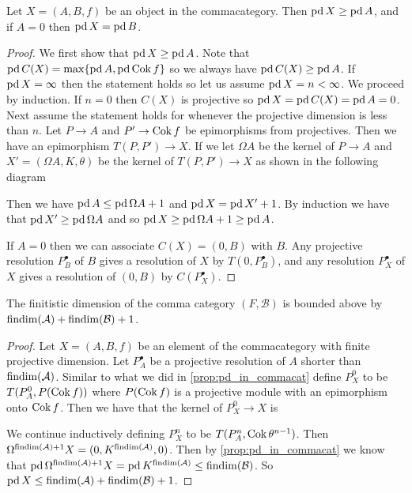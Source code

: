 \begin{prop}\cite[Lemma~4.16]{FGR75}\label{prop:pd_in_commacat}
	Let $X = (A, B, f)$ be an object in the commacategory. Then $\operatorname{pd} X \geq \operatorname{pd} A$, and if $A=0$ then $\operatorname{pd} X = \operatorname{pd} B$.
	\begin{proof}
		We first show that $\operatorname{pd} X \geq \operatorname{pd} A$. Note that $\operatorname{pd} C(X) = \max\{ \operatorname{pd} A, \operatorname{pd} \operatorname{Cok} f \}$ so we always have $\operatorname{pd} C(X) \geq \operatorname{pd} A$. If $\operatorname{pd} X = \infty$ then the statement holds so let us assume $\operatorname{pd} X = n < \infty$. We proceed by induction. If $n=0$ then $C(X)$ is projective so $\operatorname{pd} X = \operatorname{pd} C(X) = \operatorname{pd} A = 0$. Next assume the statement holds for whenever the projective dimension is less than $n$. Let $P \to A$ and $P' \to \operatorname{Cok} f$ be epimorphisms from projectives. Then we have an epimorphism $T(P, P') \to X$. If we let $\Omega A$ be the kernel of $P \to A$ and $X' = (\Omega A, K, \theta)$ be the kernel of $T(P, P') \to X$ as shown in the following diagram
		\begin{center}
		\end{center}
		Then we have $\operatorname{pd} A \leq \operatorname{pd} \Omega A + 1$ and $\operatorname{pd} X = \operatorname{pd} X' + 1$. By induction we have that $\operatorname{pd} X' \geq \operatorname{pd} \Omega A$ and so $\operatorname{pd} X \geq \operatorname{pd} \Omega A +1 \geq \operatorname{pd} A$. 
		
		If $A=0$ then we can associate $C(X)=(0, B)$ with $B$. Any projective resolution $P_B^\bullet$ of $B$ gives a resolution of $X$ by $T(0, P_B^\bullet)$, and any resolution $P_X^\bullet$ of $X$ gives a resolution of $(0, B)$ by $C(P_X^\bullet)$. 
	\end{proof}
\end{prop}

\begin{theorem}\cite[Theorem~4.20]{FGR75}
	The finitistic dimension of the comma category $(F, \mathcal B)$ is bounded above by $\operatorname{findim}(\mathcal A) + \operatorname{findim}(\mathcal B) + 1$.
	\begin{proof}
		Let $X=(A, B, f)$ be an element of the commacategory with finite projective dimension. Let $P_A^\bullet$ be a projective resolution of $A$ shorter than $\operatorname{findim}(\mathcal A)$. Similar to what we did in \cref{prop:pd_in_commacat} define $P_X^0$ to be $T(P_A^0, P(\operatorname{Cok} f))$ where $P(\operatorname{Cok} f)$ is a projective module with an epimorphism onto $\operatorname{Cok} f$. Then we have that the kernel of $P_X^0 \to X$ is 
		We continue inductively defining $P_X^n$ to be $T(P_A^n, \operatorname{Cok} \theta^{n-1})$. Then $\Omega^{\operatorname{findim}(\mathcal A)+1} X = (0, K^{\operatorname{findim}(\mathcal A)}, 0)$. Then by \cref{prop:pd_in_commacat} we know that $\operatorname{pd}\Omega^{\operatorname{findim}(\mathcal A)+1}X = \operatorname{pd} K^{\operatorname{findim}(\mathcal A)} \leq \operatorname{findim}(\mathcal B)$. So $\operatorname{pd} X \leq \operatorname{findim}(\mathcal A) + \operatorname{findim}(\mathcal B) + 1$.
	\end{proof}
\end{theorem}

